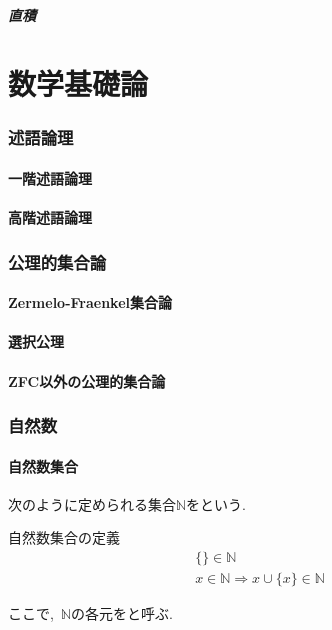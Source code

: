\documentclass[hyperref,a4paper,12pt]{kininaruki}
\begin{document}
\subsubsection{直積}
\newpage
\part{数学基礎論}
\section{述語論理}
\newpage
\subsection{一階述語論理}
\newpage
\subsection{高階述語論理}
\newpage
\section{公理的集合論}
\newpage
\subsection{Zermelo-Fraenkel集合論}
\newpage
\subsection{選択公理}
\newpage
\subsection{ZFC以外の公理的集合論}
\newpage
\section{自然数}
\subsection{自然数集合}
次のように定められる集合$\mathbb{N}$をという.
\begin{itembox}[l]{自然数集合の定義}
\begin{align}
    \{\}\in\mathbb{N}\\
    x\in\mathbb{N}\Rightarrow x\cup\{x\}\in\mathbb{N}
\end{align}
\end{itembox}

ここで,\, $\mathbb{N}$の各元をと呼ぶ.
\end{document}

